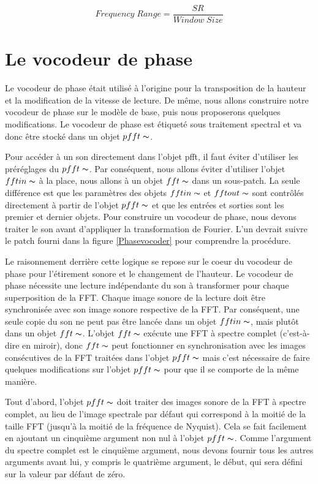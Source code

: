     \begin{equation*}
        Frequency \; Range = \frac{SR}{Window \; Size}
    \end{equation*}

\section{Le vocodeur de phase}

Le vocodeur de phase était utilisé à l'origine pour la transposition de la hauteur et la modification de la vitesse de lecture. De même, nous allons construire notre vocodeur de phase sur le modèle de base, puis nous proposerons quelques modifications. Le vocodeur de phase est étiqueté sous traitement spectral et va donc être stocké dans un objet $ pfft \thicksim $.

Pour accéder à un son directement dans l’objet pfft, il faut éviter d'utiliser les préréglages du $ pfft \thicksim $. Par conséquent, nous allons éviter d'utiliser l'objet $ fftin \thicksim $ à la place, nous allons à un objet $ fft \thicksim $ dans un sous-patch. La seule différence est que les paramètres des objets $ fftin \thicksim $ et $ fftout \thicksim $ sont contrôlés directement à partir de l'objet $ pfft \thicksim $ et que les entrées et sorties sont les premier et dernier objets. Pour construire un vocodeur de phase, nous devons traiter le son avant d'appliquer la transformation de Fourier. L’un devrait suivre le patch fourni dans la figure \ref{Phasevocoder} pour comprendre la procédure.

Le raisonnement derrière cette logique se repose sur le coeur du vocodeur de phase pour l'étirement sonore et le changement de l'hauteur. Le vocodeur de phase nécessite une lecture indépendante du son à transformer pour chaque superposition de la FFT. Chaque image sonore de la lecture doit être synchronisée avec son image sonore respective de la FFT. Par conséquent, une seule copie du son ne peut pas être lancée dans un objet $fftin\thicksim$, mais plutôt dans un objet $fft\thicksim$. L'objet $fft\thicksim$ exécute une FFT à spectre complet (c'est-à-dire en miroir), donc $fft\thicksim$ peut fonctionner en synchronisation avec les images consécutives de la FFT traitées dans l'objet $pfft\thicksim$ mais c'est nécessaire de faire quelques modifications sur l'objet $pfft\thicksim$ pour que il se comporte de la même manière.

Tout d'abord, l'objet $pfft\thicksim$ doit traiter des images sonore de la FFT à spectre complet, au lieu de l'image spectrale par défaut qui correspond à la moitié de la taille FFT (jusqu'à la moitié de la fréquence de Nyquist). Cela se fait facilement en ajoutant un cinquième argument non nul à l'objet $pfft\thicksim$. Comme l'argument du spectre complet est le cinquième argument, nous devons fournir tous les autres arguments avant lui, y compris le quatrième argument, le début, qui sera défini sur la valeur par défaut de zéro.

